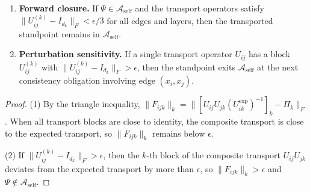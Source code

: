 \begin{proposition}
\label{prop:attractor}
\hfill
\begin{enumerate}
    \item \textbf{Forward closure.} If $\Psi \in \mathcal{A}_{\mathrm{self}}$ and the
    transport operators satisfy $\|U_{ij}^{(k)} - I_{d_k}\|_F < \epsilon / 3$ for all
    edges and layers, then the transported standpoint remains in
    $\mathcal{A}_{\mathrm{self}}$.

    \item \textbf{Perturbation sensitivity.} If a single transport operator $U_{ij}$ has
    a block $U_{ij}^{(k)}$ with $\|U_{ij}^{(k)} - I_{d_k}\|_F > \epsilon$, then the
    standpoint exits $\mathcal{A}_{\mathrm{self}}$ at the next consistency obligation
    involving edge $(x_i, x_j)$.
\end{enumerate}
\end{proposition}

\begin{proof}
(1) By the triangle inequality, $\|F_{ijk}\|_k = \|[U_{ij} U_{jk} (U_{ik}^{\exp})^{-1}]
_k - \Pi_k\|_F$. When all transport blocks are close to identity, the composite transport
is close to the expected transport, so $\|F_{ijk}\|_k$ remains below $\epsilon$.

(2) If $\|U_{ij}^{(k)} - I_{d_k}\|_F > \epsilon$, then the $k$-th block of the composite
transport $U_{ij} U_{jk}$ deviates from the expected transport by more than $\epsilon$,
so $\|F_{ijk}\|_k > \epsilon$ and $\Psi \notin \mathcal{A}_{\mathrm{self}}$.
\end{proof}
